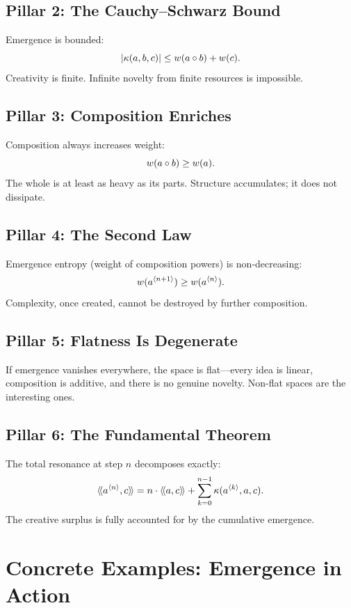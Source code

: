 \subsection{Pillar 2: The Cauchy--Schwarz Bound}

Emergence is bounded:
\[
  |\kappa(a,b,c)| \leq w(a \circ b) + w(c).
\]
Creativity is finite. Infinite novelty from finite resources is impossible.

\subsection{Pillar 3: Composition Enriches}

Composition always increases weight:
\[
  w(a \circ b) \geq w(a).
\]
The whole is at least as heavy as its parts. Structure accumulates; it does not
dissipate.

\subsection{Pillar 4: The Second Law}

Emergence entropy (weight of composition powers) is non-decreasing:
\[
  w(a^{\langle n+1 \rangle}) \geq w(a^{\langle n \rangle}).
\]
Complexity, once created, cannot be destroyed by further composition.

\subsection{Pillar 5: Flatness Is Degenerate}

If emergence vanishes everywhere, the space is flat---every idea is linear,
composition is additive, and there is no genuine novelty. Non-flat spaces are
the interesting ones.

\subsection{Pillar 6: The Fundamental Theorem}

The total resonance at step $n$ decomposes exactly:
\[
  \langle\!\langle a^{\langle n \rangle}, c \rangle\!\rangle = n \cdot \langle\!\langle a, c \rangle\!\rangle + \sum_{k=0}^{n-1} \kappa(a^{\langle k \rangle}, a, c).
\]
The creative surplus is fully accounted for by the cumulative emergence.


\section{Concrete Examples: Emergence in Action}


